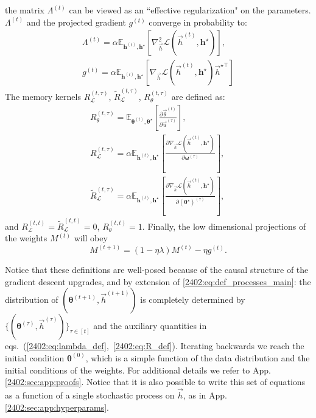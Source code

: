 the matrix $\Lambda^{(t)}$ can be viewed as an ``effective regularization" on the parameters. $\Lambda^{(t)}$ and the projected gradient $g^{(t)}$ converge in probability to:
\begin{align} \label{2402:eq:lambda_def}
    \Lambda^{(t)}  =  \alpha\mathbb{E}_{\boldsymbol{h}^{(t)}, \boldsymbol{h}^\star}\left[\nabla^2_{\vec h}\mathcal{L}\left( \vec h^{(t)}, \boldsymbol{h}^\star\right)\right] , \\ g^{(t)} = \alpha \mathbb{E}_{\boldsymbol{h}^{(t)}, \boldsymbol{h}^\star}\left[\nabla_{\vec h}\mathcal{L}\left( \vec h^{(t)}, \boldsymbol{h}^\star\right) \vec h^{\star\top}\right]
\end{align}
The memory kernels $R_\mathcal{L}^{(t,\tau)}$, $\tilde R_\mathcal{L}^{(t,\tau)}$, $R_\theta^{(t,\tau)}$ are defined as: 
\begin{eqnarray} \label{2402:eq:R_def}
    &R_\theta^{(t,\tau)} = \mathbb{E}_{\boldsymbol{\theta}^{(t)}, \boldsymbol{\theta}^\star}\left[\frac{\partial  \vec \theta^{(t)}}{\partial  \vec u^{(\tau)}} \right] , \nonumber  \\
    &R_\mathcal{L}^{(t,\tau)} = \alpha \mathbb{E}_{\boldsymbol{h}^{(t)}, \boldsymbol{h}^\star}\left[\frac{\partial  \nabla_{\vec h}\mathcal{L}\left( \vec h^{(t)}, \boldsymbol{h}^\star\right)}{\partial  \boldsymbol\omega^{(\tau)}} \right] ,\\
    &\tilde R_\mathcal{L}^{(t,\tau)} = \alpha \mathbb{E}_{\boldsymbol{h}^{(t)}, \boldsymbol{h}^\star}\left[\frac{\partial  \nabla_{\vec h}\mathcal{L}\left( \vec h^{(t)}, \boldsymbol{h}^\star\right)}{\partial  \left(\boldsymbol\theta^\star\right)^{(\tau)}} \right] ,\quad
\end{eqnarray}
and $R_\mathcal{L}^{(t,t)} = \tilde R_\mathcal{L}^{(t,t)} = 0$, $R_\theta^{(t,t)}=1$.
Finally, the low dimensional projections of the weights $M^{(t)}$ will obey
\begin{equation} \label{2402:eq:M_update}
    M^{(t+1)} = (1-\eta\lambda)M^{(t)} -\eta g^{(t)}   .
\end{equation}

Notice that these definitions are well-posed because of the causal structure of the gradient descent upgrades, and by extension of \eqref{2402:eq:def_processes_main}: the distribution of $(\boldsymbol \theta^{(t+1)}, \vec h^{(t+1)})$ is completely determined by $\{ (\boldsymbol\theta^{(\tau)}, \vec h^{(\tau)})\}_{\tau \in [t]}$ and the auxiliary quantities in eqs.~(\ref{2402:eq:lambda_def},~\ref{2402:eq:R_def}). Iterating backwards we reach the initial condition $\boldsymbol \theta^{(0)}$, which is a simple function of the data distribution and the initial conditions of the weights. For additional details we refer to App. \ref{2402:sec:app:proofs}. Notice that it is also possible to write this set of equations as a function of a single stochastic process on $\vec h$, as in App. \ref{2402:sec:app:hyperparams}.

